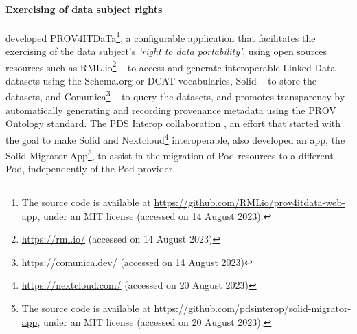 \paragraph{Exercising of data subject rights} 
\cite{de_mulder_prov4itdata_2021} developed PROV4ITDaTa\footnote{The source code is available at \url{https://github.com/RMLio/prov4itdata-web-app}, under an MIT license (accessed on 14 August 2023).}, a configurable application that facilitates the exercising of the data subject's \textit{`right to data portability'}, using open sources resources such as RML.io\footnote{\url{https://rml.io/} (accessed on 14 August 2023)} \citep{dimou_rml_2014} -- to access and generate interoperable Linked Data datasets using the Schema.org or DCAT vocabularies, Solid -- to store the datasets, and Comunica\footnote{\url{https://comunica.dev/} (accessed on 14 August 2023)} \citep{taelman_comunica_2018} -- to query the datasets, and promotes transparency by automatically generating and recording provenance metadata using the PROV Ontology standard.
The PDS Interop collaboration \citeyearpar{noauthor_pds_2021}, an effort that started with the goal to make Solid and Nextcloud\footnote{\url{https://nextcloud.com/} (accessed on 20 August 2023)} interoperable, also developed an app, the Solid Migrator App\footnote{The source code is available at \url{https://github.com/pdsinterop/solid-migrator-app}, under an MIT license (accessed on 20 August 2023).}, to assist in the migration of Pod resources to a different Pod, independently of the Pod provider.

